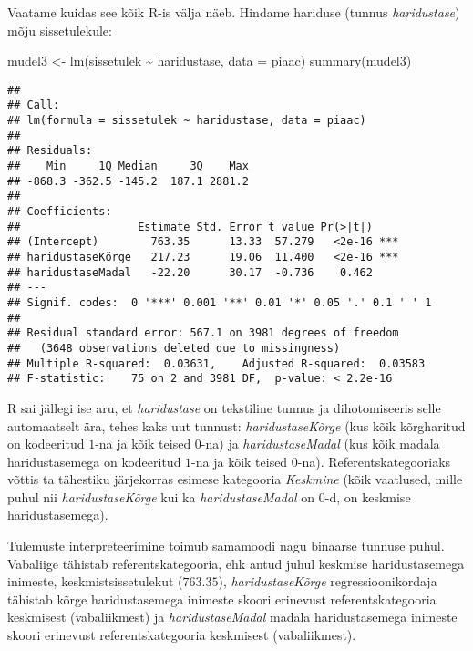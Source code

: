 \documentclass[
]{book}
\newenvironment{Shaded}{\begin{snugshade}}{\end{snugshade}}
\newcommand{\AttributeTok}[1]{\textcolor[rgb]{0.77,0.63,0.00}{#1}}
\newcommand{\FunctionTok}[1]{\textcolor[rgb]{0.00,0.00,0.00}{#1}}
\newcommand{\NormalTok}[1]{#1}
\newcommand{\OtherTok}[1]{\textcolor[rgb]{0.56,0.35,0.01}{#1}}
\newcommand{\SpecialCharTok}[1]{\textcolor[rgb]{0.00,0.00,0.00}{#1}}
\begin{document}
Vaatame kuidas see kõik R-is välja näeb. Hindame hariduse (tunnus \emph{haridustase}) mõju sissetulekule:

\begin{Shaded}
\begin{Highlighting}[]
\NormalTok{mudel3 }\OtherTok{\textless{}{-}} \FunctionTok{lm}\NormalTok{(sissetulek }\SpecialCharTok{\textasciitilde{}}\NormalTok{ haridustase, }\AttributeTok{data =}\NormalTok{ piaac)}
\FunctionTok{summary}\NormalTok{(mudel3)}
\end{Highlighting}
\end{Shaded}

\begin{verbatim}
## 
## Call:
## lm(formula = sissetulek ~ haridustase, data = piaac)
## 
## Residuals:
##    Min     1Q Median     3Q    Max 
## -868.3 -362.5 -145.2  187.1 2881.2 
## 
## Coefficients:
##                  Estimate Std. Error t value Pr(>|t|)    
## (Intercept)        763.35      13.33  57.279   <2e-16 ***
## haridustaseKõrge   217.23      19.06  11.400   <2e-16 ***
## haridustaseMadal   -22.20      30.17  -0.736    0.462    
## ---
## Signif. codes:  0 '***' 0.001 '**' 0.01 '*' 0.05 '.' 0.1 ' ' 1
## 
## Residual standard error: 567.1 on 3981 degrees of freedom
##   (3648 observations deleted due to missingness)
## Multiple R-squared:  0.03631,    Adjusted R-squared:  0.03583 
## F-statistic:    75 on 2 and 3981 DF,  p-value: < 2.2e-16
\end{verbatim}

R sai jällegi ise aru, et \emph{haridustase} on tekstiline tunnus ja dihotomiseeris selle automaatselt ära, tehes kaks uut tunnust: \emph{haridustaseKõrge} (kus kõik kõrgharitud on kodeeritud \(1\)-na ja kõik teised \(0\)-na) ja \emph{haridustaseMadal} (kus kõik madala haridustasemega on kodeeritud \(1\)-na ja kõik teised \(0\)-na). Referentskategooriaks võttis ta tähestiku järjekorras esimese kategooria \emph{Keskmine} (kõik vaatlused, mille puhul nii \emph{haridustaseKõrge} kui ka \emph{haridustaseMadal} on \(0\)-d, on keskmise haridustasemega).

Tulemuste interpreteerimine toimub samamoodi nagu binaarse tunnuse puhul. Vabaliige tähistab referentskategooria, ehk antud juhul keskmise haridustasemega inimeste, keskmistsissetulekut (\(763.35\)), \emph{haridustaseKõrge} regressioonikordaja tähistab kõrge haridustasemega inimeste skoori erinevust referentskategooria keskmisest (vabaliikmest) ja \emph{haridustaseMadal} madala haridustasemega inimeste skoori erinevust referentskategooria keskmisest (vabaliikmest).
\end{document}
